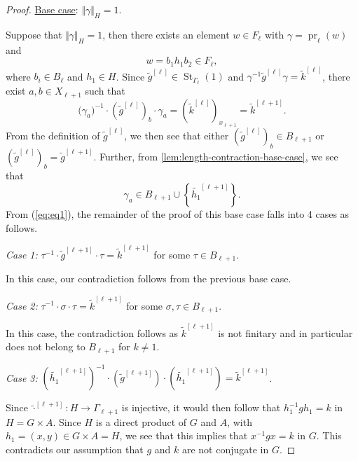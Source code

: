\documentclass[a4paper]{amsart}
\numberwithin{equation}{section}
\theoremstyle{definition}
\theoremstyle{remark}
\DeclareMathOperator{\pr}{pr}
\DeclareMathOperator{\St}{St}
\newcommand{\absH}[1]{\Vert #1 \Vert_H}
\begin{document}
\begin{proof}
\medskip

\noindent\underline{Base case}: $\absH{\gamma} = 1$.
\nopagebreak

\nopagebreak\smallskip
\nopagebreak\noindent
Suppose that $\absH{\gamma}=1$, then there exists an element $w\in F_\ell$ with $\gamma = \pr_\ell(w)$ and
\begin{equation}\label{eq:base-case1}
    w = b_1 h_1 b_2\in F_\ell,
\end{equation}
where $b_i\in B_\ell$ and $h_1 \in H$.
Since $\widetilde{g}^{[\ell]}\in \St_{\Gamma_\ell}(1)$ and $\gamma^{-1} \widetilde{g}^{[\ell]} \gamma = \widetilde{k}^{[\ell]}$, there exist $a,b\in X_{\ell+1}$ such that
\begin{equation}\label{eq:eq1}
    \bigl(\gamma_a\bigr)^{-1}
    \cdot (\widetilde{g}^{[\ell]})_b
    \cdot \gamma_a
    =
    (\widetilde{k}^{[\ell]})_{x_{\ell+1}} = \widetilde{k}^{[\ell+1]}.
\end{equation}
From the definition of $\widetilde{g}^{[\ell]}$, we then see that either $(\widetilde{g}^{[\ell]})_b \in B_{\ell+1}$ or $(\widetilde{g}^{[\ell]})_b = \widetilde{g}^{[\ell+1]}$.
Further, from \cref{lem:length-contraction-base-case}, we see that \[\gamma_{a} \in B_{\ell+1} \cup \left\{\widetilde{h_1}^{[\ell+1]}\right\}.\]
From (\ref{eq:eq1}), the remainder of the proof of this base case falls into 4 cases as follows.

\medskip

\noindent\textit{Case 1:}
$\tau^{-1} \cdot \widetilde{g}^{[\ell+1]}\cdot \tau = \widetilde{k}^{[\ell+1]}$ for some $\tau\in B_{\ell+1}$.

\smallskip\noindent
In this case, our contradiction follows from the previous base case.

\medskip

\noindent\textit{Case 2:}
$\tau^{-1}\cdot \sigma\cdot \tau = \widetilde{k}^{[\ell+1]}$ for some $\sigma,\tau\in B_{\ell+1}$.

\smallskip\noindent
In this case, the contradiction follows as $\widetilde{k}^{[\ell+1]}$ is not finitary and in particular does not belong to $B_{\ell+1}$ for $k\neq 1$.

\medskip

\noindent\textit{Case 3:}
$(\widetilde{h_1}^{[\ell+1]})^{-1}\cdot (\widetilde{g}^{[\ell+1]})\cdot (\widetilde{h_1}^{[\ell+1]}) = \widetilde{k}^{[\ell+1]}$.

\smallskip\noindent
Since $\widetilde{\cdot}^{[\ell+1]} \colon H\to\Gamma_{\ell+1}$ is injective, it would then follow that $h_1^{-1} g h_1 = k$ in $H=G\times A$.
Since $H$ is a direct product of $G$ and $A$, with $h_1 = (x,y)\in G\times A = H$, we see that this implies that $x^{-1} g x = k$ in $G$.
This contradicts our assumption that $g$ and $k$ are not conjugate in $G$.


\end{proof}
\end{document}

